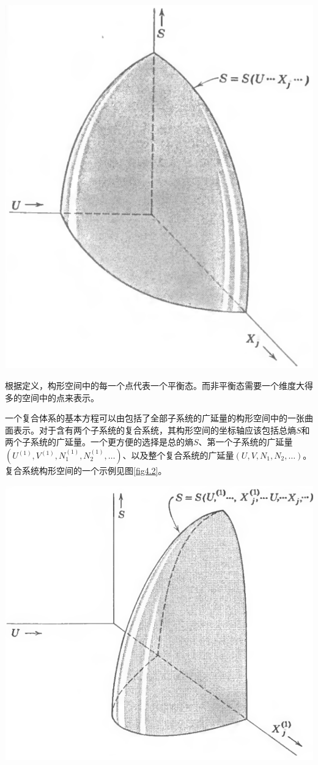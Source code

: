 {
	\centering
	\includegraphics[width=.7\textwidth]{Pictures/fig4.1.png}
	\label{fig4.1}
}

根据定义，构形空间中的每一个点代表一个平衡态。而非平衡态需要一个维度大得多的空间中的点来表示。

一个复合体系的基本方程可以由包括了全部子系统的广延量的构形空间中的一张曲面表示。对于含有两个子系统的复合系统，其构形空间的坐标轴应该包括总熵$S$和两个子系统的广延量。一个更方便的选择是总的熵$S$、第一个子系统的广延量$(U^{(1)},V^{(1)},N^{(1)}_1,N^{(1)}_2,\dots)$、以及整个复合系统的广延量$(U,V,N_1,N_2,\dots)$。复合系统构形空间的一个示例见图\ref{fig4.2}。

{
	\centering
	\includegraphics[width=.8\textwidth]{Pictures/fig4.2.png}
	\label{fig4.2}
}


